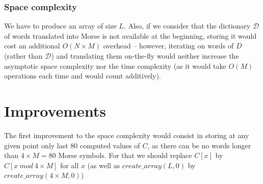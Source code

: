 \documentclass{article}
\begin{document}
\subsubsection*{Space complexity}
We have to produce an array of size $L$. Also, if we consider that the dictionary $\mathcal{D}$ of words translated into Morse is not available at the beginning, storing it would cost an additional $O(N\times M)$ overhead -- however, iterating on words of $D$ (rather than $\mathcal{D}$) and translating them on-the-fly would neither increase the asymptotic space complexity nor the time complexity (as it would take $O(M)$ operations each time and would count additively).
\section{Improvements}
The first improvement to the space complexity would consist in storing at any given point only last 80 computed values of $C$, as there can be no words longer than $4\times M = 80$ Morse symbols. For that we should replace $C[x]$ by $C[x\ mod\ 4\times M]$ for all $x$ (as well as $create\_array(L, 0)$ by $create\_array(4\times M, 0)$)
\end{document}
